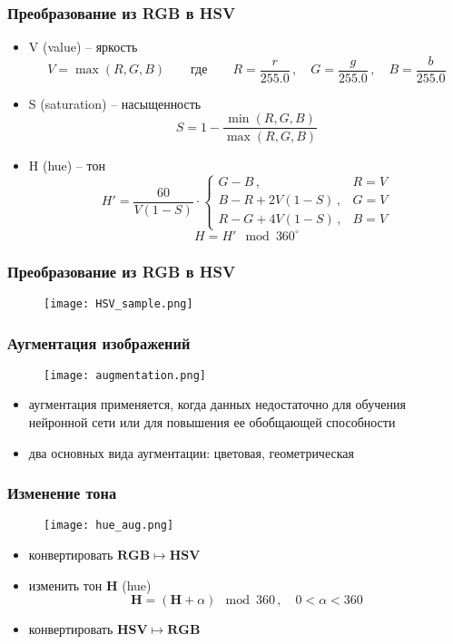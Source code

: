 \documentclass[
    12pt, 
    usepdftitle=false,
    aspectratio=1610
]{beamer}
\begin{document}
\begin{frame}
\frametitle{Преобразование из RGB в HSV}
\begin{itemize}
    \item V (value) -- яркость
    $$
        V = \max(R,G,B)\qquad
        \mbox{где}\qquad
        R=\frac{r}{255.0}\,,\quad
        G=\frac{g}{255.0}\,,\quad
        B=\frac{b}{255.0}
    $$
    \item S (saturation) -- насыщенность
    $$
        S=1-\frac{\min(R,G,B)}{\max(R,G,B)}
    $$
    \item H (hue) -- тон
    $$
    H' = \frac{60}{V(1-S)}\cdot
    \begin{cases}
        G-B\,, & R=V\\
        B-R+2V(1-S)\,, & G=V\\
        R-G+4V(1-S)\,, & B=V
    \end{cases}
    $$
    $$
        H = H' \mod 360^\circ
    $$
\end{itemize}
\end{frame}

\begin{frame}
\frametitle{Преобразование из RGB в HSV}
\begin{figure}
    \centering
    \texttt{[image: HSV\_sample.png]}
\end{figure}
\end{frame}

\begin{frame}
\frametitle{Аугментация изображений}
\begin{figure}
    \centering
    \texttt{[image: augmentation.png]}
\end{figure}
\begin{itemize}
    \item аугментация применяется, когда данных недостаточно для обучения нейронной сети или для повышения ее обобщающей способности
    \item два основных вида аугментации: цветовая, геометрическая
\end{itemize}
\end{frame}

\begin{frame}
\frametitle{Изменение тона}
\begin{figure}
    \centering
    \texttt{[image: hue\_aug.png]}
\end{figure}
\begin{itemize}
    \item конвертировать $\mathbf{RGB}\mapsto\mathbf{HSV}$
    \item изменить тон \textbf{H} (hue)
    $$
      \mathbf{H} = (\mathbf{H} + \alpha) \mod 360\,,\quad
      0 < \alpha < 360
    $$
    \item конвертировать $\mathbf{HSV}\mapsto\mathbf{RGB}$
\end{itemize}
\end{frame}
\end{document}
